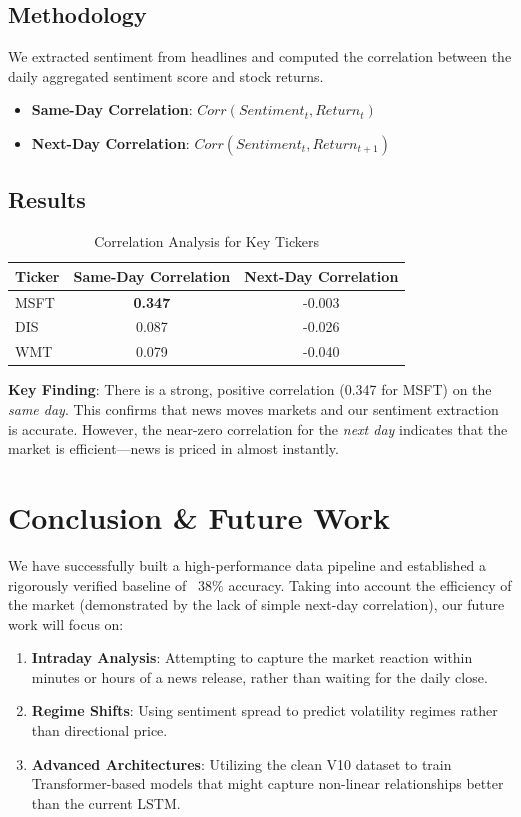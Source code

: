 \documentclass{article}
\begin{document}
\subsection{Methodology}
We extracted sentiment from headlines and computed the correlation between the daily aggregated sentiment score and stock returns.
\begin{itemize}
    \item \textbf{Same-Day Correlation}: $Corr(Sentiment_t, Return_t)$
    \item \textbf{Next-Day Correlation}: $Corr(Sentiment_t, Return_{t+1})$
\end{itemize}

\subsection{Results}
\begin{table}[h]
\centering
\begin{tabular}{lcc}
\toprule
Ticker & Same-Day Correlation & Next-Day Correlation \\
\midrule
MSFT & \textbf{0.347} & -0.003 \\
DIS & 0.087 & -0.026 \\
WMT & 0.079 & -0.040 \\
\bottomrule
\end{tabular}
\caption{Correlation Analysis for Key Tickers}
\end{table}

\textbf{Key Finding}: There is a strong, positive correlation (0.347 for MSFT) on the \textit{same day}. This confirms that news moves markets and our sentiment extraction is accurate. However, the near-zero correlation for the \textit{next day} indicates that the market is efficient—news is priced in almost instantly.

\section{Conclusion \& Future Work}
We have successfully built a high-performance data pipeline and established a rigorously verified baseline of ~38\% accuracy. Taking into account the efficiency of the market (demonstrated by the lack of simple next-day correlation), our future work will focus on:
\begin{enumerate}
    \item \textbf{Intraday Analysis}: Attempting to capture the market reaction within minutes or hours of a news release, rather than waiting for the daily close.
    \item \textbf{Regime Shifts}: Using sentiment spread to predict volatility regimes rather than directional price.
    \item \textbf{Advanced Architectures}: Utilizing the clean V10 dataset to train Transformer-based models that might capture non-linear relationships better than the current LSTM.
\end{enumerate}
\end{document}
